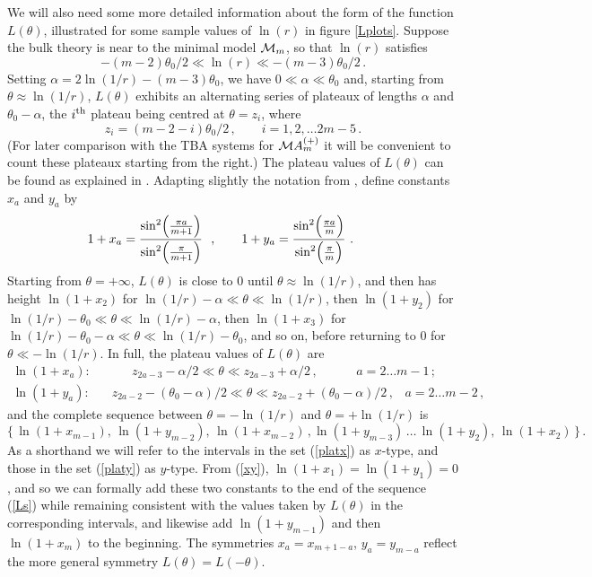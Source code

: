 \documentclass[11pt]{article}
\newcommand{\CM}{{\cal M}}
\newcommand\beq{\begin{equation}}
\newcommand\eeq{\end{equation}}
\newcommand{\tz}{\theta_0}
\begin{document}
We will also need some more detailed information about the form of the
function $L(\theta)$, illustrated for some sample values of $\ln(r)$
in figure \ref{Lplots}. Suppose
the bulk theory is near to the minimal model $\CM_m$, so that
$\ln(r)$ satisfies 
\beq
-(m{-}2)\tz/2 \ll \ln(r)\ll -(m{-}3)\tz/2 \,.
\label{rrange}
\eeq
Setting
$\alpha=2\ln(1/r)-(m{-}3)\tz$, we have
$0\ll\alpha\ll\tz$ and, starting from $\theta\approx \ln(1/r)$, 
$L(\theta)$ exhibits an alternating series
of plateaux of lengths $\alpha$ and $\tz-\alpha$, the
$i^{\rm th}$ plateau being centred at $\theta=z_i$, where
\beq
z_i=(m{-}2{-}i)\tz/2\,,\qquad i=1, 2,\dots 2m{-}5\,.
\eeq
(For later comparison with the TBA systems for $\CM A^{(+)}_m$ it will
be convenient to count these plateaux starting from the right.)
The plateau values of
$L(\theta)$ can be found as explained in 
\cite{Dorey:1992bq}. Adapting slightly the
notation from \cite{Zamolodchikov:1991vh,Zamolodchikov:1991vx}, 
define
constants $x_a$ and $y_a$ by
\beq
1+x_a=
\frac{\sin^2\Bigl(\frac{\pi a}{m+1}\Bigr)}%
{\sin^2\Bigl(\frac{\pi}{m+1}\Bigr)}~~,\qquad
1+y_a=
\frac{\sin^2\Bigl(\frac{\pi a}{m}\Bigr)}%
{\sin^2\Bigl(\frac{\pi}{m}\Bigr)}~.\qquad
\label{xy}
\eeq
Starting from $\theta=+\infty$, $L(\theta)$ is close to 
$0$ until $\theta\approx \ln(1/r)$, and then has 
height $\ln(1+x_2)$ for
$\ln(1/r)-\alpha\ll\theta\ll\ln(1/r)$, 
then $\ln(1+y_2)$ for $\ln(1/r)-\tz\ll\theta\ll\ln(1/r)-\alpha$, 
then $\ln(1+x_3)$ for
$\ln(1/r)-\tz-\alpha\ll\theta\ll\ln(1/r)-\tz$, 
and so on, before returning to $0$ for $\theta\ll-\ln(1/r)$. 
In full, the plateau values of $L(\theta)$ are
\begin{align}
\ln(1{+}x_{a}):&~~~~~~~~~~~
z_{2a-3}-\alpha/2\ll\theta\ll 
z_{2a-3}+\alpha/2\,,\qquad~~~~\, a=2\dots m{-}1\,;
\label{platx}\\[4pt]
\ln(1{+}y_{a}):&~~~\,
z_{2a-2}-(\tz{-}\alpha)/2\ll\theta\ll 
z_{2a-2}+(\tz{-}\alpha)/2\,,~~~\, a=2\dots m{-}2\,,
\label{platy}
\end{align}
and the complete sequence between $\theta=-\ln(1/r)$ and
$\theta=+\ln(1/r)$ is
\beq
\{
\,
\ln(1{+}x_{m-1}),\,
\ln(1{+}y_{m-2}),\,
\ln(1{+}x_{m-2})\,,
\ln(1{+}y_{m-3})\, \dots\,
\ln(1{+}y_{2}),\,
\ln(1{+}x_{2})
\,
\}\,.
\label{Ls}
\eeq
As a shorthand we will refer to the intervals in the set 
(\ref{platx}) as $x$-type, and those in the set (\ref{platy}) as
$y$-type.
From (\ref{xy}),
$\ln(1{+}x_1)= \ln(1{+}y_1)= 0$, and so
we can formally add these two constants to
the end of the sequence (\ref{Ls})
while remaining consistent with the values taken by 
$L(\theta)$ in the corresponding intervals, and likewise add 
$\ln(1{+}y_{m-1})$ and then $\ln(1{+}x_m)$ to the beginning. 
The symmetries $x_a=x_{m+1-a}$, $y_a=y_{m-a}$ reflect the more general
symmetry $L(\theta)=L(-\theta)$.
\end{document}
